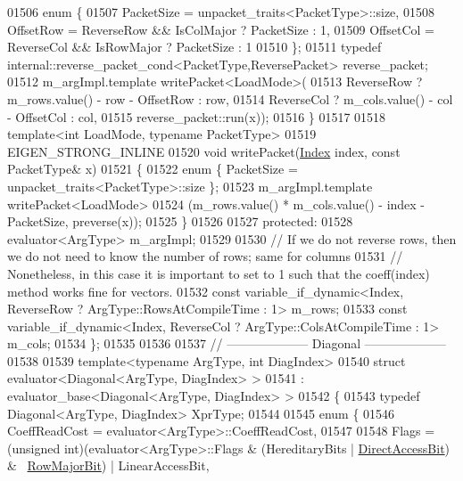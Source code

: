 \begin{DoxyCode}
01506     \textcolor{keyword}{enum} \{
01507       PacketSize = unpacket\_traits<PacketType>::size,
01508       OffsetRow  = ReverseRow && IsColMajor ? PacketSize : 1,
01509       OffsetCol  = ReverseCol && IsRowMajor ? PacketSize : 1
01510     \};
01511     \textcolor{keyword}{typedef} internal::reverse\_packet\_cond<PacketType,ReversePacket> reverse\_packet;
01512     m\_argImpl.template writePacket<LoadMode>(
01513                                   ReverseRow ? m\_rows.value() - row - OffsetRow : row,
01514                                   ReverseCol ? m\_cols.value() - col - OffsetCol : col,
01515                                   reverse\_packet::run(x));
01516   \}
01517 
01518   \textcolor{keyword}{template}<\textcolor{keywordtype}{int} LoadMode, \textcolor{keyword}{typename} PacketType>
01519   EIGEN\_STRONG\_INLINE
01520   \textcolor{keywordtype}{void} writePacket(\hyperlink{namespace_eigen_a62e77e0933482dafde8fe197d9a2cfde}{Index} index, \textcolor{keyword}{const} PacketType& x)
01521   \{
01522     \textcolor{keyword}{enum} \{ PacketSize = unpacket\_traits<PacketType>::size \};
01523     m\_argImpl.template writePacket<LoadMode>
01524       (m\_rows.value() * m\_cols.value() - index - PacketSize, preverse(x));
01525   \}
01526  
01527 \textcolor{keyword}{protected}:
01528   evaluator<ArgType> m\_argImpl;
01529 
01530   \textcolor{comment}{// If we do not reverse rows, then we do not need to know the number of rows; same for columns}
01531   \textcolor{comment}{// Nonetheless, in this case it is important to set to 1 such that the coeff(index) method works fine for
       vectors.}
01532   \textcolor{keyword}{const} variable\_if\_dynamic<Index, ReverseRow ? ArgType::RowsAtCompileTime : 1> m\_rows;
01533   \textcolor{keyword}{const} variable\_if\_dynamic<Index, ReverseCol ? ArgType::ColsAtCompileTime : 1> m\_cols;
01534 \};
01535 
01536 
01537 \textcolor{comment}{// -------------------- Diagonal --------------------}
01538 
01539 \textcolor{keyword}{template}<\textcolor{keyword}{typename} ArgType, \textcolor{keywordtype}{int} DiagIndex>
01540 \textcolor{keyword}{struct }evaluator<Diagonal<ArgType, DiagIndex> >
01541   : evaluator\_base<Diagonal<ArgType, DiagIndex> >
01542 \{
01543   \textcolor{keyword}{typedef} Diagonal<ArgType, DiagIndex> XprType;
01544   
01545   \textcolor{keyword}{enum} \{
01546     CoeffReadCost = evaluator<ArgType>::CoeffReadCost,
01547     
01548     Flags = (\textcolor{keywordtype}{unsigned} int)(evaluator<ArgType>::Flags & (HereditaryBits | 
      \hyperlink{group__flags_gabf1e9d0516a933445a4c307ad8f14915}{DirectAccessBit}) & ~\hyperlink{group__flags_gae4f56c2a60bbe4bd2e44c5b19cbe8762}{RowMajorBit}) | LinearAccessBit,

\end{DoxyCode}
